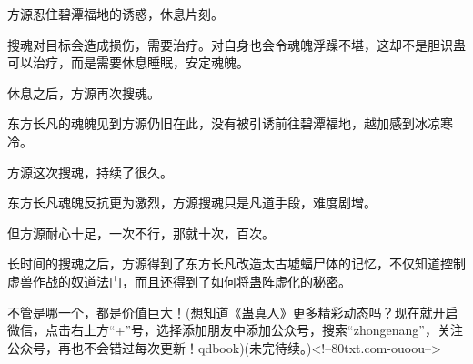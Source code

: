 \begin{this_body}
方源忍住碧潭福地的诱惑，休息片刻。

搜魂对目标会造成损伤，需要治疗。对自身也会令魂魄浮躁不堪，这却不是胆识蛊可以治疗，而是需要休息睡眠，安定魂魄。

休息之后，方源再次搜魂。

东方长凡的魂魄见到方源仍旧在此，没有被引诱前往碧潭福地，越加感到冰凉寒冷。

方源这次搜魂，持续了很久。

东方长凡魂魄反抗更为激烈，方源搜魂只是凡道手段，难度剧增。

但方源耐心十足，一次不行，那就十次，百次。

长时间的搜魂之后，方源得到了东方长凡改造太古墟蝠尸体的记忆，不仅知道控制虚兽作战的奴道法门，而且还得到了如何将蛊阵虚化的秘密。

不管是哪一个，都是价值巨大！(想知道《蛊真人》更多精彩动态吗？现在就开启微信，点击右上方“+”号，选择添加朋友中添加公众号，搜索“zhongenang”，关注公众号，再也不会错过每次更新！qdbook)(未完待续。)<!--80txt.com-ouoou-->

\end{this_body}

